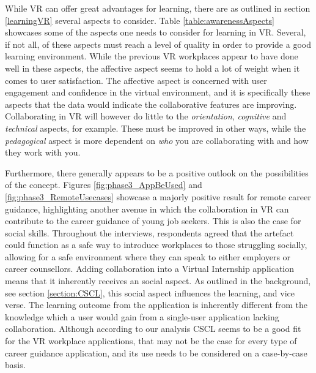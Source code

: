 While VR can offer great advantages for learning, there are as outlined in section \ref{learningVR} several aspects to consider. Table \ref{table:awarenessAspects} showcases some of the aspects one needs to consider for learning in VR. Several, if not all, of these aspects must reach a level of quality in order to provide a good learning environment. While the previous VR workplaces appear to have done well in these aspects, the affective aspect seems to hold a lot of weight when it comes to user satisfaction. The affective aspect is concerned with user engagement and confidence in the virtual environment, and it is specifically these aspects that the data would indicate the collaborative features are improving. Collaborating in VR will however do little to the \textit{orientation}, \textit{cognitive} and \textit{technical} aspects, for example. These must be improved in other ways, while the \textit{pedagogical} aspect is more dependent on \textit{who} you are collaborating with and how they work with you.



Furthermore, there generally appears to be a positive outlook on the possibilities of the concept. Figures \ref{fig:phase3_AppBeUsed} and \ref{fig:phase3_RemoteUsecases} showcase a majorly positive result for remote career guidance, highlighting another avenue in which the collaboration in VR can contribute to the career guidance of young job seekers. This is also the case for social skills. Throughout the interviews, respondents agreed that the artefact could function as a safe way to introduce workplaces to those struggling socially, allowing for a safe environment where they can speak to either employers or career counsellors. Adding collaboration into a Virtual Internship application means that it inherently receives an social aspect. As outlined in the background, see section \ref{section:CSCL}, this social aspect influences the  learning, and vice verse. The learning outcome from the application is inherently different from the knowledge which a user would gain from a single-user application lacking collaboration. Although according to our analysis CSCL seems to be a good fit for the VR workplace applications, that may not be the case for every type of career guidance application, and its use needs to be considered on a case-by-case basis.  




